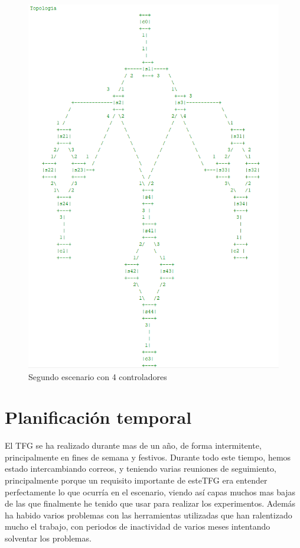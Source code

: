 \documentclass[a4paper, 12pt]{book}
\begin{document}
		\begin{figure}
			\centering
			\includegraphics[width=16cm, keepaspectratio]{img/mesh4c}
			\caption{Segundo escenario con 4 controladores}
			\label{figura:mesh4c}
		\end{figure}
	
	\cleardoublepage
	\section{Planificación temporal}
	\label{sec:planificacion-temporal}
	
	El TFG se ha realizado durante mas de un año, de forma intermitente, principalmente en fines de semana y festivos. Durante todo este tiempo, hemos estado intercambiando correos, y teniendo varias reuniones de seguimiento, principalmente porque un requisito importante de esteTFG era entender perfectamente lo que ocurría en el escenario, viendo así capas muchos mas bajas de las que finalmente he tenido que usar para realizar los experimentos.
	Además ha habido varios problemas con las herramientas utilizadas que han ralentizado mucho el trabajo, con periodos de inactividad de varios meses intentando solventar los problemas.
	
\end{document}

